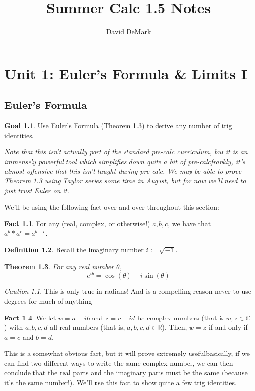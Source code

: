 \documentclass[english]{article}
\title{Summer Calc 1.5 Notes}
\author{David DeMark}
\date{\due}
\newcommand{\RR}{\mathbb{R}}
\newcommand{\CC}{\mathbb{C}}
\newtheorem{theorem}{Theorem}[section]
\theoremstyle{remark}
\newtheorem{caution}{Caution}[theorem]
\theoremstyle{definition}
\newtheorem{definition}[theorem]{Definition}
\newtheorem*{goal}{Goal}
\newtheorem{fact}[theorem]{Fact}
\begin{document}
\maketitle
\chapter{Unit 1: Euler's Formula \& Limits I}
\setcounter{section}{-1}
\section{Euler's Formula}
\begin{goal} Use Euler's Formula (Theorem \ref{thm:eufl}) to derive any number of trig identities.
	\end{goal}
\emph{Note that this isn't actually part of the standard pre-calc curriculum, but it is an immensely powerful tool which simplifies down quite a bit of pre-calc\textemdash frankly, it's almost offensive that this isn't taught during pre-calc. We may be able to prove Theorem \ref{thm:eufl} using Taylor series some time in August, but for now we'll need to just trust Euler on it.}

We'll be using the following fact over and over throughout this section:
\begin{fact}
	For any (real, complex, or otherwise!) $a,b,c$, we have that $a^b*a^c=a^{b+c}$.
\end{fact}

\begin{definition}
	Recall the imaginary number $i:=\sqrt{-1}$. 
\end{definition}

\begin{theorem}
\label{thm:eufl} For any real number $\theta$, $$e^{i\theta}=\cos(\theta)+i\sin(\theta)$$
\end{theorem}
\begin{caution}
	This is only true in radians! And is a compelling reason never to use degrees for much of anything\textellipsis
\end{caution}
\begin{fact}\label{fact:cplx=}
	We let $w=a+ib$ and $z=c+id$ be complex numbers (that is $w,z\in \CC$) with $a,b,c,d$ all real numbers (that is, $a,b,c,d\in \RR$). Then, $w=z$ if and only if $a=c$ and $b=d$.
\end{fact}

This is a somewhat obvious fact, but it will prove extremely useful\textemdash basically, if we can find two different ways to write the same complex number, we can then conclude that the real parts and the imaginary parts must be the same (because it's the same number!). We'll use this fact to show quite a few trig identities.
\end{document}
